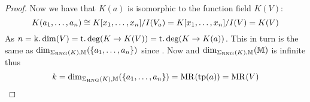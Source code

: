 \begin{proof}
    Now we have that $K(a)$ is isomorphic to the function field $K(V)$:
    \[
        K(a_1,\dots,a_n) \iso %
        K[x_1,\dots,x_n] / I(V_a) = 
        K[x_1,\dots,x_n] / I(V) = K(V)
    \]
    As  
    $n = \operatorname{k.dim}(V) = \operatorname{t.deg}(K \to K(V)) = \operatorname{t.deg}(K \to K(a))$. 
    This in turn is the same as 
    $\dim_{\Sigma_{\mathrm{RNG}}(K),\mathbb{M}}(\left\{a_1,\dots,a_n\right\})$
    since .
    Now 
    and $\dim_{\Sigma_{\mathrm{RNG}}(K),\mathbb{M}}(\mathbb{M})$ is infinite %
    thus 
    \[
        k = \dim_{\Sigma_{\mathrm{RNG}}(K),\mathbb{M}}(\left\{a_1,\dots,a_n\right\}) 
        = \mathrm{MR}^{}(\operatorname{tp}(a)) = \mathrm{MR}^{}(V)
    \]
\end{proof}